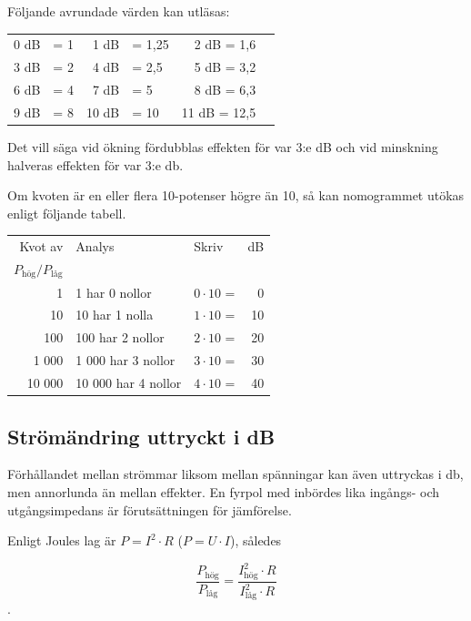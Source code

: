 Följande avrundade värden kan utläsas:

\begin{center}
\begin{tabular}{rlrlrl}
0 dB & = 1 &  1 dB & =  1,25 & 2 dB = 1,6 \\
3 dB & = 2 &  4 dB & =  2,5  & 5 dB = 3,2 \\
6 dB & = 4 &  7 dB & =  5    & 8 dB = 6,3 \\
9 dB & = 8 & 10 dB & = 10    & 11 dB = 12,5
\end{tabular}
\end{center}

Det vill säga vid ökning fördubblas effekten för var 3:e dB och vid minskning
halveras effekten för var 3:e \unit{\decibel}.

Om kvoten är en eller flera 10-potenser högre än 10, så kan nomogrammet utökas
enligt följande tabell.

\begin{center}
\begin{tabular}{rllr}
Kvot av & Analys             & Skriv            & dB \\
\(P_{\text{hög}}/P_{\text{låg}}\) &          &                  &    \\
     1 & 1 har 0 nollor      & \(0 \cdot 10\) = &  0 \\
    10 & 10 har 1 nolla      & \(1 \cdot 10\) = & 10 \\
   100 & 100 har 2 nollor    & \(2 \cdot 10\) = & 20 \\
 1 000 &  1 000 har 3 nollor & \(3 \cdot 10\) = & 30 \\
10 000 & 10 000 har 4 nollor & \(4 \cdot 10\) = & 40
\end{tabular}
\end{center}

\subsection{Strömändring uttryckt i dB}

Förhållandet mellan strömmar liksom mellan spänningar kan även uttryckas i
\unit{\decibel}, men annorlunda än mellan effekter.
En fyrpol med inbördes lika ingångs- och utgångsimpedans är förutsättningen för
jämförelse.

Enligt Joules lag är \(P = I^2 \cdot R\) (\(P = U \cdot I\)), således

\[\dfrac{P_{\text{hög}}}{P_{\text{låg}}} = \dfrac{I_{\text{hög}}^2 \cdot R}{I_{\text{låg}}^2 \cdot R}\].

